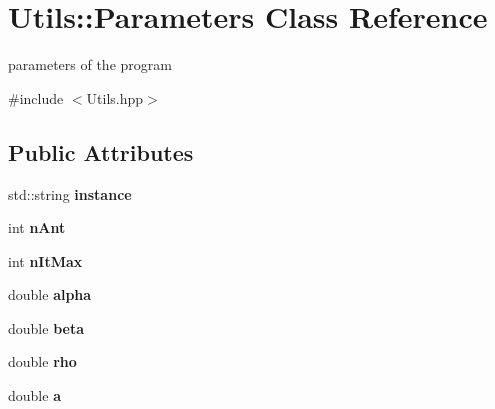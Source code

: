 \hypertarget{classUtils_1_1Parameters}{}\section{Utils\+:\+:Parameters Class Reference}
\label{classUtils_1_1Parameters}


parameters of the program  




{\ttfamily \#include $<$Utils.\+hpp$>$}

\subsection*{Public Attributes}
\begin{DoxyCompactItemize}
\item 
std\+::string {\bfseries instance}\hypertarget{classUtils_1_1Parameters_ae593c75deabf01579aef9469611a82b1}{}\label{classUtils_1_1Parameters_ae593c75deabf01579aef9469611a82b1}

\item 
int {\bfseries n\+Ant}\hypertarget{classUtils_1_1Parameters_abf2382e7659ef9907d0d8659ae2394f9}{}\label{classUtils_1_1Parameters_abf2382e7659ef9907d0d8659ae2394f9}

\item 
int {\bfseries n\+It\+Max}\hypertarget{classUtils_1_1Parameters_a556e768245072cd14ecfbfb3de65713e}{}\label{classUtils_1_1Parameters_a556e768245072cd14ecfbfb3de65713e}

\item 
double {\bfseries alpha}\hypertarget{classUtils_1_1Parameters_aebb91fccfd275a1062cb906901b3323e}{}\label{classUtils_1_1Parameters_aebb91fccfd275a1062cb906901b3323e}

\item 
double {\bfseries beta}\hypertarget{classUtils_1_1Parameters_a889547f84b7ca5f5d5601c7560b4aaa0}{}\label{classUtils_1_1Parameters_a889547f84b7ca5f5d5601c7560b4aaa0}

\item 
double {\bfseries rho}\hypertarget{classUtils_1_1Parameters_ad8602652ad03924e7a325b946451d870}{}\label{classUtils_1_1Parameters_ad8602652ad03924e7a325b946451d870}

\item 
double {\bfseries a}\hypertarget{classUtils_1_1Parameters_a2fdec5e0727e686b6c2e9a198908e549}{}\label{classUtils_1_1Parameters_a2fdec5e0727e686b6c2e9a198908e549}


\end{DoxyCompactItemize}
